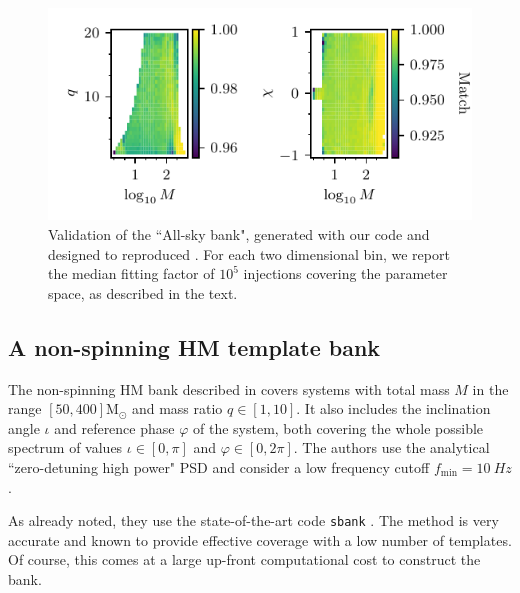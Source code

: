 \documentclass[twocolumn,showpacs,preprintnumbers,nofootinbib,prd,
superscriptaddress,10pt]{revtex4-2}
\begin{document}
\begin{figure}
	\includegraphics[scale = 1.]{bank_O4_injections}
	\caption{Validation of the ``All-sky bank", generated with our code and designed to reproduced \cite{Sakon:2022ibh}. For each two dimensional bin, we report the median fitting factor of $10^5$ injections covering the parameter space, as described in the text.}
	\label{fig:bank_O4_injections}
\end{figure}

\subsection{A non-spinning HM template bank} \label{sec:HM_comparison}

The non-spinning HM bank described in \cite{Harry:2017weg} covers systems with total mass $M$ in the range $[50, 400] \mathrm{M_\odot}$ and mass ratio $q\in [1,10]$. It also includes the inclination angle $\iota$ and reference phase $\varphi$ of the system, both covering the whole possible spectrum of values $\iota\in [0,\pi]$ and $\varphi\in [0,2\pi]$.
The authors use the analytical ``zero-detuning high power" PSD \cite{OLD_PSDs} and consider a low frequency cutoff $f_\text{min} = \SI{10}{Hz}$.

As already noted, they use the state-of-the-art code \texttt{sbank} \cite{Ajith:2012mn, PhysRevD.80.104014}.
The method is very accurate and known to provide effective coverage with a low number of templates. Of course, this comes at a large up-front computational cost to construct the bank.
\end{document}
